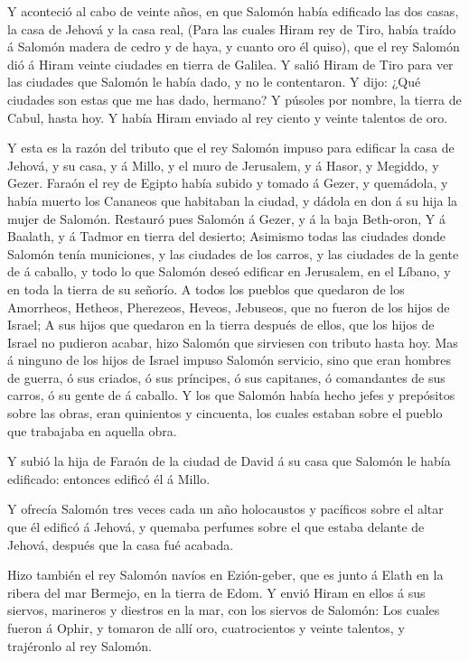  Y aconteció al cabo de veinte años, en que Salomón había
edificado las dos casas, la casa de Jehová y la casa real, 
(Para las cuales Hiram rey de Tiro, había traído á Salomón madera de
cedro y de haya, y cuanto oro él quiso), que el rey Salomón dió á Hiram
veinte ciudades en tierra de Galilea.  Y salió Hiram de
Tiro para ver las ciudades que Salomón le había dado, y no le
contentaron.  Y dijo: ¿Qué ciudades son estas que me has
dado, hermano? Y púsoles por nombre, la tierra de Cabul, hasta hoy.
 Y había Hiram enviado al rey ciento y veinte talentos de
oro.

 Y esta es la razón del tributo que el rey Salomón impuso
para edificar la casa de Jehová, y su casa, y á Millo, y el muro de
Jerusalem, y á Hasor, y Megiddo, y Gezer.  Faraón el rey de
Egipto había subido y tomado á Gezer, y quemádola, y había muerto los
Cananeos que habitaban la ciudad, y dádola en don á su hija la mujer de
Salomón.  Restauró pues Salomón á Gezer, y á la baja
Beth-oron,  Y á Baalath, y á Tadmor en tierra del desierto;
 Asimismo todas las ciudades donde Salomón tenía
municiones, y las ciudades de los carros, y las ciudades de la gente de
á caballo, y todo lo que Salomón deseó edificar en Jerusalem, en el
Líbano, y en toda la tierra de su señorío.  A todos los
pueblos que quedaron de los Amorrheos, Hetheos, Pherezeos, Heveos,
Jebuseos, que no fueron de los hijos de Israel;  A sus
hijos que quedaron en la tierra después de ellos, que los hijos de
Israel no pudieron acabar, hizo Salomón que sirviesen con tributo hasta
hoy.  Mas á ninguno de los hijos de Israel impuso Salomón
servicio, sino que eran hombres de guerra, ó sus criados, ó sus
príncipes, ó sus capitanes, ó comandantes de sus carros, ó su gente de á
caballo.  Y los que Salomón había hecho jefes y prepósitos
sobre las obras, eran quinientos y cincuenta, los cuales estaban sobre
el pueblo que trabajaba en aquella obra.

 Y subió la hija de Faraón de la ciudad de David á su casa
que Salomón le había edificado: entonces edificó él á Millo.

 Y ofrecía Salomón tres veces cada un año holocaustos y
pacíficos sobre el altar que él edificó á Jehová, y quemaba perfumes
sobre el que estaba delante de Jehová, después que la casa fué acabada.

 Hizo también el rey Salomón navíos en Ezión-geber, que es
junto á Elath en la ribera del mar Bermejo, en la tierra de Edom.
 Y envió Hiram en ellos á sus siervos, marineros y diestros
en la mar, con los siervos de Salomón:  Los cuales fueron á
Ophir, y tomaron de allí oro, cuatrocientos y veinte talentos, y
trajéronlo al rey Salomón.

